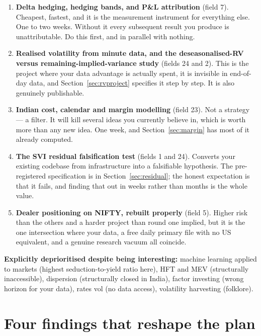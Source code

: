 \documentclass[11pt,a4paper]{article}
\begin{document}
\begin{enumerate}
\item \textbf{Delta hedging, hedging bands, and P\&L attribution} (field 7).
Cheapest, fastest, and it is the measurement instrument for everything else. One
to two weeks. Without it every subsequent result you produce is unattributable.
Do this first, and in parallel with nothing.

\item \textbf{Realised volatility from minute data, and the deseasonalised-RV
versus remaining-implied-variance study} (fields 24 and 2). This is the project
where your data advantage is actually spent, it is invisible in end-of-day data,
and Section~\ref{sec:rvproject} specifies it step by step. It is also genuinely
publishable.

\item \textbf{Indian cost, calendar and margin modelling} (field 23). Not a
strategy --- a filter. It will kill several ideas you currently believe in, which
is worth more than any new idea. One week, and Section~\ref{sec:margin} has most
of it already computed.

\item \textbf{The SVI residual falsification test} (fields 1 and 24). Converts
your existing codebase from infrastructure into a falsifiable hypothesis. The
pre-registered specification is in Section~\ref{sec:residual}; the honest
expectation is that it fails, and finding that out in weeks rather than months is
the whole value.

\item \textbf{Dealer positioning on NIFTY, rebuilt properly} (field 5). Higher
risk than the others and a harder project than round one implied, but it is the
one intersection where your data, a free daily primary file with no US
equivalent, and a genuine research vacuum all coincide.
\end{enumerate}

\textbf{Explicitly deprioritised despite being interesting:} machine learning
applied to markets (highest seduction-to-yield ratio here), HFT and MEV
(structurally inaccessible), dispersion (structurally closed in India), factor
investing (wrong horizon for your data), rates vol (no data access), volatility
harvesting (folklore).

\newpage
\section{Four findings that reshape the plan}
\label{sec:constraints}
\end{document}
